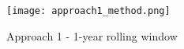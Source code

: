 \documentclass[a4paper]{report}
\begin{document}


\begin{figure}[h] %
  \centering
  \texttt{[image: approach1\_method.png]} %
  \caption{Approach 1 - 1-year rolling window}
  \label{fig:approach1}
\end{figure}
\end{document}
